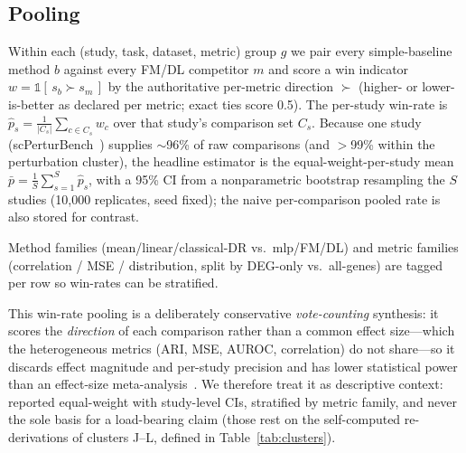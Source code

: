 \documentclass[fleqn,10pt,lineno]{wlpeerj}  %
\begin{document}
\subsection{Pooling}
Within each (study, task, dataset, metric) group $g$ we pair every simple-baseline method $b$ against every FM/DL competitor $m$ and score a win indicator $w=\mathbb{1}[\,s_b \succ s_m\,]$ by the authoritative per-metric direction $\succ$ (higher- or lower-is-better as declared per metric; exact ties score 0.5). The per-study win-rate is $\hat p_s = \frac{1}{|C_s|}\sum_{c\in C_s} w_c$ over that study's comparison set $C_s$. Because one study (scPerturBench~\cite{scperturbench2025}) supplies ${\sim}$96\% of raw comparisons (and $>$99\% within the perturbation cluster), the headline estimator is the equal-weight-per-study mean $\bar p = \frac{1}{S}\sum_{s=1}^{S}\hat p_s$, with a 95\% CI from a nonparametric bootstrap resampling the $S$ studies (10{,}000 replicates, seed fixed); the naive per-comparison pooled rate is also stored for contrast.

Method families (mean/linear/classical-DR vs.\ mlp/FM/DL) and metric families (correlation / MSE / distribution, split by DEG-only vs.\ all-genes) are tagged per row so win-rates can be stratified.

This win-rate pooling is a deliberately conservative \emph{vote-counting} synthesis: it scores the \emph{direction} of each comparison rather than a common effect size---which the heterogeneous metrics (ARI, MSE, AUROC, correlation) do not share---so it discards effect magnitude and per-study precision and has lower statistical power than an effect-size meta-analysis~\cite{borenstein2009}. We therefore treat it as descriptive context: reported equal-weight with study-level CIs, stratified by metric family, and never the sole basis for a load-bearing claim (those rest on the self-computed re-derivations of clusters J--L, defined in Table~\ref{tab:clusters}).
\end{document}
